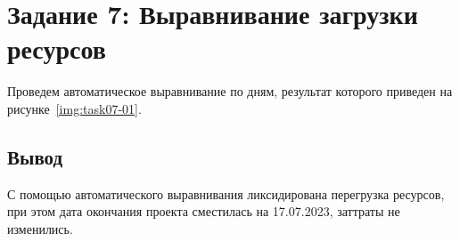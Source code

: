 \section{Задание 7: Выравнивание загрузки ресурсов}

Проведем автоматическое выравнивание по дням, результат которого приведен на
рисунке~\ref{img:task07-01}.


\subsection*{Вывод}

С помощью автоматического выравнивания ликсидирована перегрузка ресурсов, при
этом дата окончания проекта сместилась на 17.07.2023, заттраты не изменились.
